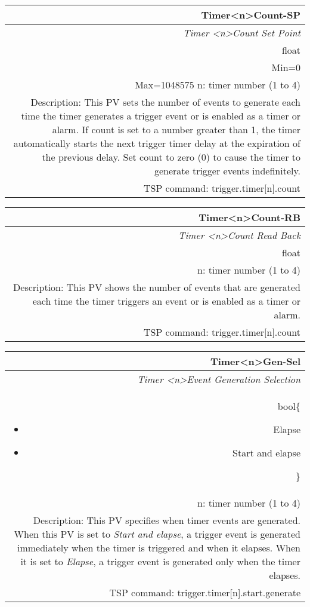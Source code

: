 \documentclass[openany]{article}
\begin{document}
		\begin{tabular}{N}
			\hline
			\bfseries Timer{\textless n\textgreater}Count-SP\label{pv:timercount-sp} \\ \hline
			\emph{Timer \textless n\textgreater Count Set Point} \\
			float \\
			Min=0 \\
			Max=1048575
			n: timer number (1 to 4) \\
			Description: This PV sets the number of events to generate each time the timer generates a trigger event or is enabled as a timer or alarm. If count is set to a number greater than 1, the timer automatically starts the next trigger timer delay at the expiration of the previous delay. Set count to zero (0) to cause the timer to generate trigger events indefinitely. \\
			TSP command: trigger.timer[n].count
		\end{tabular}

		\begin{tabular}{N}
			\hline
			\bfseries Timer{\textless n\textgreater}Count-RB\label{pv:timercount-rb} \\ \hline
			\emph{Timer \textless n\textgreater Count Read Back} \\
			float \\
			n: timer number (1 to 4) \\
			Description: This PV shows the number of events that are generated each time the timer triggers an event or is enabled as a timer or alarm. \\
			TSP command: trigger.timer[n].count
		\end{tabular}

		\begin{tabular}{N}
			\hline
			\bfseries Timer{\textless n\textgreater}Gen-Sel\label{pv:timergen-sel} \\ \hline
			\emph{Timer \textless n\textgreater Event Generation Selection} \\
			bool\{\begin{itemize}[noitemsep]
				\small
				\item[] Elapse
				\item[] Start and elapse
			\end{itemize}\} \\
			n: timer number (1 to 4) \\
			Description: This PV specifies when timer events are generated. When this PV is set to \emph{Start and elapse}, a trigger event is generated immediately when the timer is triggered and when it elapses. When it is set to \emph{Elapse}, a trigger event is generated only when the timer elapses. \\
			TSP command: trigger.timer[n].start.generate
		\end{tabular}
\end{document}
